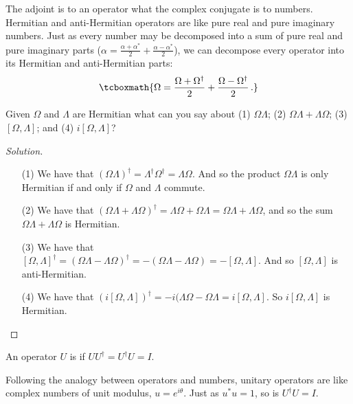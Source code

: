 The adjoint is to an operator what the complex conjugate is to numbers. Hermitian and anti-Hermitian operators are like pure real and pure imaginary numbers. Just as every number may be decomposed into a sum of pure real and pure imaginary parts ($\alpha = \frac{\alpha + \alpha^*}{2} + \frac{\alpha - \alpha^*}{2}$), we can decompose every operator into its Hermitian and anti-Hermitian parts:
\begin{equation}\label{matrix decomposition}
    \tcboxmath{\Omega = \frac{\Omega + \Omega^\dagger}{2} + \frac{\Omega - \Omega^\dagger}{2}\,.}
\end{equation}

\begin{exercise}
Given $\Omega$ and $\Lambda$ are Hermitian what can you say about (1) $\Omega\Lambda$; (2) $\Omega\Lambda + \Lambda\Omega$; (3) $[\Omega, \Lambda]$; and (4) $i[\Omega, \Lambda]$?
\end{exercise}

\begin{proof}[Solution]
\begin{enumerate}
    \item[(1)] We have that $(\Omega\Lambda)^\dagger = \Lambda^\dagger \Omega^\dagger = \Lambda\Omega$. And so the product $\Omega\Lambda$ is only Hermitian if and only if $\Omega$ and $\Lambda$ commute.
    \item[(2)] We have that $(\Omega\Lambda + \Lambda\Omega)^\dagger = \Lambda\Omega + \Omega\Lambda = \Omega\Lambda + \Lambda\Omega$, and so the sum $\Omega\Lambda + \Lambda\Omega$ is Hermitian.
    \item[(3)] We have that \\$[\Omega, \Lambda]^\dagger = (\Omega\Lambda - \Lambda\Omega)^\dagger = -(\Omega\Lambda - \Lambda\Omega) = -[\Omega, \Lambda]$. And so $[\Omega, \Lambda]$ is anti-Hermitian.
    \item[(4)] We have that $(i[\Omega, \Lambda])^\dagger = -i(\Lambda\Omega - \Omega\Lambda = i[\Omega, \Lambda]$. So $i[\Omega, \Lambda]$ is Hermitian.
\end{enumerate}
\end{proof}

\begin{shaded*}
An operator $U$ is  if $UU^\dagger = U^\dagger U = I$.
\end{shaded*}

Following the analogy between operators and numbers, unitary operators are like complex numbers of unit modulus, $u = e^{i\theta}$. Just as $u^*u = 1$, so is $U^\dagger U = I$.

